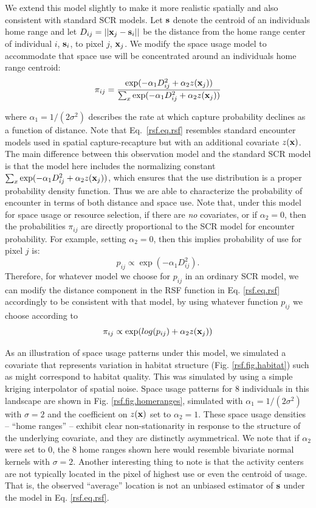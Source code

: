 \documentclass[12pt]{article}
\begin{document}
We extend this model slightly to make it more realistic spatially and
also consistent with standard SCR models. Let
${\bf s}$ denote the centroid of an individuals home range and let
$D_{ij} = ||{\bf x}_{j} - {\bf s}_{i}||$ be the distance from the home
range center of individual $i$, ${\bf s}_{i}$, to pixel $j$, ${\bf
  x}_{j}$. We modify the space usage model to accommodate that space
use will be concentrated around an individuals home range centroid:
\begin{equation}
 \pi_{ij} = \frac{ \exp( -\alpha_{1} D_{ij}^{2} +\alpha_{2} z({\bf x}_{j}) ) }
{ \sum_{x} \exp(-\alpha_{1} D_{ij}^{2} +\alpha_{2} z({\bf x}_{j}))}
\label{rsf.eq.rsf}
\end{equation}

{\flushleft where} $\alpha_1=1/(2\sigma^2)$ describes the rate at which capture
probability declines as a function of distance. 
Note that
Eq.~\ref{rsf.eq.rsf} resembles standard encounter models used in
spatial capture-recapture but with an additional covariate $z({\bf
  x})$.  
The main difference between this observation model and the standard
SCR
model is that the model here 
includes the normalizing
constant $\sum_{x} \exp(-\alpha_{1} D_{ij}^{2} +\alpha_{2} z({\bf
  x}_{j}))$, which ensures that the use distribution is a proper
probability density function. Thus we are able to characterize the
probability of encounter in terms of both distance and space use.
Note that, under
this model for space usage or resource selection, if there are {\it no}
covariates, or if $\alpha_{2} = 0$, then the probabilities
$\pi_{ij}$ are directly proportional to the SCR model for encounter
probability.  For example, setting $\alpha_{2} = 0$, then this implies
probability of use for pixel $j$ is:
\[
p_{ij} \propto  \exp( -\alpha_{1} D_{ij}^{2}).
\]
Therefore, 
for whatever model we choose for
$p_{ij}$ in an ordinary SCR model, we can modify the distance
component in the RSF function in Eq. \ref{rsf.eq.rsf} accordingly to
be consistent with that model, by using whatever function $p_{ij}$ we
choose according to
\[
\pi_{ij} \propto \exp( log(p_{ij}) + \alpha_{2} z({\bf x}_{j}) )
\]


As an illustration of space usage patterns under this model, we
simulated a covariate that represents variation in habitat structure
(Fig. \ref{rsf.fig.habitat}) such as might correspond to habitat
quality.
This was simulated by using a
simple kriging interpolator  of spatial noise.
Space usage patterns for
 8 individuals in this landscape are shown in Fig. \ref{rsf.fig.homeranges},
simulated with $\alpha_{1} = 1/(2\sigma^2)$ with $\sigma = 2$ and the
coefficient on $z({\bf x})$ set to $\alpha_{2} = 1$.
These space usage densities -- ``home ranges'' -- exhibit clear
non-stationarity in response to the structure of the underlying
covariate, and they are distinctly asymmetrical.  We note that if
$\alpha_{2}$ were set to 0, the 8 home ranges shown here would
resemble bivariate normal kernels with $\sigma = 2$.  Another
interesting thing to note is that the activity centers are not
typically located in the pixel of highest use or even the centroid of
usage. That is, the observed ``average'' location is not an unbiased
estimator of ${\bf s}$ under the model in Eq. \ref{rsf.eq.rsf}.
\end{document}
